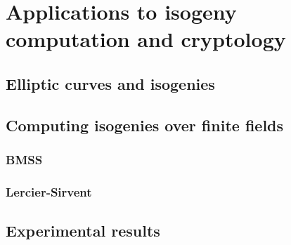 \part{Applications to isogeny computation and cryptology}

\chapter{Elliptic curves and isogenies}


\chapter{Computing isogenies over finite fields}
\label{cha:algor-small-char}



\section{BMSS}
\label{sec:bmss}
\section{Lercier-Sirvent}
\label{sec:lercier-sirvent}






\chapter{Experimental results}




%

